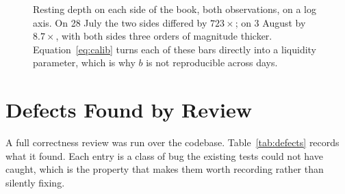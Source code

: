 \documentclass[11pt]{article}
\begin{document}
\begin{figure}[htbp]
\centering
{}
\caption[Resting order-book depth, both observations]{Resting depth on each side of the book, both observations, on a log
axis. On 28 July the two sides differed by $723\times$; on 3 August by
$8.7\times$, with both sides three orders of magnitude thicker. Equation~\ref{eq:calib}
turns each of these bars directly into a liquidity parameter, which is why $b$ is
not reproducible across days.}
\label{fig:book}
\end{figure}
\section{Defects Found by Review}

A full correctness review was run over the codebase. Table~\ref{tab:defects}
records what it found. Each entry is a class of bug the existing tests could not
have caught, which is the property that makes them worth recording rather than
silently fixing.
\end{document}
